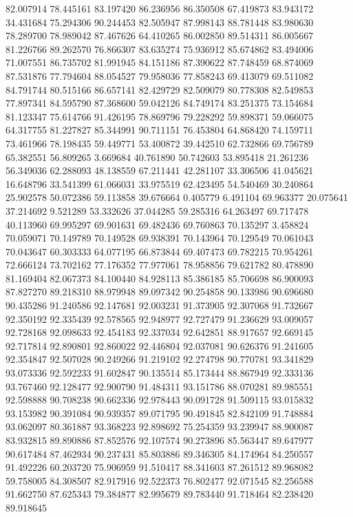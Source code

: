 82.007914
78.445161
83.197420
86.236956
86.350508
67.419873
83.943172
34.431684
75.294306
90.244453
82.505947
87.998143
88.781448
83.980630
78.289700
78.989042
87.467626
64.410265
86.002850
89.514311
86.005667
81.226766
89.262570
76.866307
83.635274
75.936912
85.674862
83.494006
71.007551
86.735702
81.991945
84.151186
87.390622
87.748459
68.874069
87.531876
77.794604
88.054527
79.958036
77.858243
69.413079
69.511082
84.791744
80.515166
86.657141
82.429729
82.509079
80.778308
82.549853
77.897341
84.595790
87.368600
59.042126
84.749174
83.251375
73.154684
81.123347
75.614766
91.426195
78.869796
79.228292
59.898371
59.066075
64.317755
81.227827
85.344991
90.711151
76.453804
64.868420
74.159711
73.461966
78.198435
59.449771
53.400872
39.442510
62.732866
69.756789
65.382551
56.809265
3.669684
40.761890
50.742603
53.895418
21.261236
56.349036
62.288093
48.138559
67.211441
42.281107
33.306506
41.045621
16.648796
33.541399
61.066031
33.975519
62.423495
54.540469
30.240864
25.902578
50.072386
59.113858
39.676664
0.405779
6.491104
69.963377
20.075641
37.214692
9.521289
53.332626
37.044285
59.285316
64.263497
69.717478
40.113960
69.995297
69.901631
69.482436
69.760863
70.135297
3.458824
70.059071
70.149789
70.149528
69.938391
70.143964
70.129549
70.061043
70.043647
60.303333
64.077195
66.873844
69.407473
69.782215
70.954261
72.666124
73.702162
77.176352
77.977061
78.958856
79.621782
80.478890
81.169404
82.067373
84.100440
84.928113
85.386185
85.706698
86.900093
87.827270
89.218310
88.979948
89.097342
90.254858
90.133986
90.696680
90.435286
91.240586
92.147681
92.003231
91.373905
92.307068
91.732667
92.350192
92.335439
92.578565
92.948977
92.727479
91.236629
93.009057
92.728168
92.098633
92.454183
92.337034
92.642851
88.917657
92.669145
92.717814
92.890801
92.860022
92.446804
92.037081
90.626376
91.241605
92.354847
92.507028
90.249266
91.219102
92.274798
90.770781
93.341829
93.073336
92.592233
91.602847
90.135514
85.173444
88.867949
92.333136
93.767460
92.128477
92.900790
91.484311
93.151786
88.070281
89.985551
92.598888
90.708238
90.662336
92.978443
90.091728
91.509115
93.015832
93.153982
90.391084
90.939357
89.071795
90.491845
82.842109
91.748884
93.062097
80.361887
93.368223
92.898692
75.254359
93.239947
88.900087
83.932815
89.890886
87.852576
92.107574
90.273896
85.563447
89.647977
90.617484
87.462934
90.237431
85.803886
89.346305
84.174964
84.250557
91.492226
60.203720
75.906959
91.510417
88.341603
87.261512
89.968082
59.758005
84.308507
82.917916
92.522373
76.802477
92.071545
82.256588
91.662750
87.625343
79.384877
82.995679
89.783440
91.718464
82.238420
89.918645
